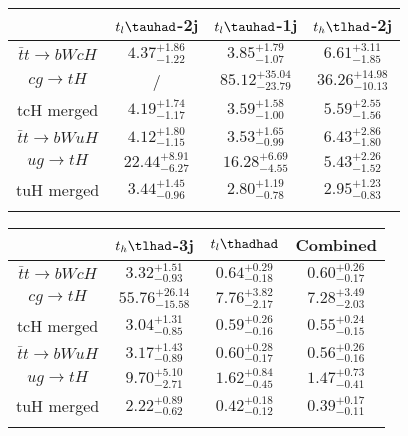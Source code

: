 \centering
\begin{tabular}{|cccc} \toprule\toprule
 & $t_l\tauhad$-2j & $t_l\tauhad$-1j & $t_h\tlhad$-2j\\\midrule
$\bar{t}t\to bWcH$ & $4.37^{+1.86}_{-1.22}$ & $3.85^{+1.79}_{-1.07}$ & $6.61^{+3.11}_{-1.85}$\\
$cg\to tH$ &  / & $85.12^{+35.04}_{-23.79}$ & $36.26^{+14.98}_{-10.13}$\\
tcH merged & $4.19^{+1.74}_{-1.17}$ & $3.59^{+1.58}_{-1.00}$ & $5.59^{+2.55}_{-1.56}$\\
$\bar{t}t\to bWuH$ & $4.12^{+1.80}_{-1.15}$ & $3.53^{+1.65}_{-0.99}$ & $6.43^{+2.86}_{-1.80}$\\
$ug\to tH$ & $22.44^{+8.91}_{-6.27}$ & $16.28^{+6.69}_{-4.55}$ & $5.43^{+2.26}_{-1.52}$\\
tuH merged & $3.44^{+1.45}_{-0.96}$ & $2.80^{+1.19}_{-0.78}$ & $2.95^{+1.23}_{-0.83}$\\
\bottomrule\bottomrule\\
\end{tabular}
\begin{tabular}{|cccc} \toprule\toprule
 & $t_h\tlhad$-3j & $t_l\thadhad$ & Combined\\\midrule
$\bar{t}t\to bWcH$ & $3.32^{+1.51}_{-0.93}$ & $0.64^{+0.29}_{-0.18}$ & $0.60^{+0.26}_{-0.17}$\\
$cg\to tH$ & $55.76^{+26.14}_{-15.58}$ & $7.76^{+3.82}_{-2.17}$ & $7.28^{+3.49}_{-2.03}$\\
tcH merged & $3.04^{+1.31}_{-0.85}$ & $0.59^{+0.26}_{-0.16}$ & $0.55^{+0.24}_{-0.15}$\\
$\bar{t}t\to bWuH$ & $3.17^{+1.43}_{-0.89}$ & $0.60^{+0.28}_{-0.17}$ & $0.56^{+0.26}_{-0.16}$\\
$ug\to tH$ & $9.70^{+5.10}_{-2.71}$ & $1.62^{+0.84}_{-0.45}$ & $1.47^{+0.73}_{-0.41}$\\
tuH merged & $2.22^{+0.89}_{-0.62}$ & $0.42^{+0.18}_{-0.12}$ & $0.39^{+0.17}_{-0.11}$\\
\bottomrule\bottomrule\\
\end{tabular}

